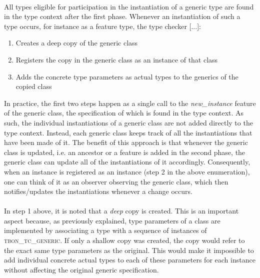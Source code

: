 \paragraph{} All types eligible for participation in the instantiation of a generic type are found in the type context after the first phase. Whenever an instantiation of such a type occurs, for instance as a feature type, the type checker [...]:
\begin{enumerate}
\item Creates a deep copy of the generic class
\item Registers the copy in the generic class as an instance of that class
\item Adds the concrete type parameters as actual types to the generics of the copied class
\end{enumerate}
In practice, the first two steps happen as a single call to the \textit{new\_instance} feature of the generic class, the specification of which is found in the type context. As such, the individual instantiations of a generic class are not added directly to the type context. Instead, each generic class keeps track of all the instantiations that have been made of it. The benefit of this approach is that whenever the generic class is updated, i.e. an ancestor or a feature is added in the second phase, the generic class can update all of the instantiations of it accordingly. Consequently, when an instance is registered as an instance (step 2 in the above enumeration), one can think of it as an observer observing the generic class, which then notifies/updates the instantiations whenever a change occurs.
\paragraph{} In step 1 above, it is noted that a \emph{deep} copy is created. This is an important aspect because, as previously explained, type parameters of a class are implemented by associating a type with a sequence of instances of \textsc{tbon}\_\textsc{tc}\_\textsc{generic}. If only a shallow copy was created, the copy would refer to the exact same type parameters as the original. This would make it impossible to add individual concrete actual types to each of these parameters for each instance without affecting the original generic specification.
